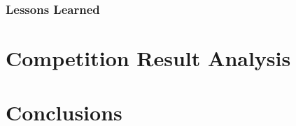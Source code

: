 \documentclass[ece]{uw-wkrpt}
\let\oldsection\section
\renewcommand\section{\clearpage\oldsection}
\begin{document}
\subsubsection{Lessons Learned}

% 
\section{Competition Result Analysis}

% 
\section{Conclusions}

\begingroup
\raggedright
\sloppy

\endgroup

\appendix
\end{document}
